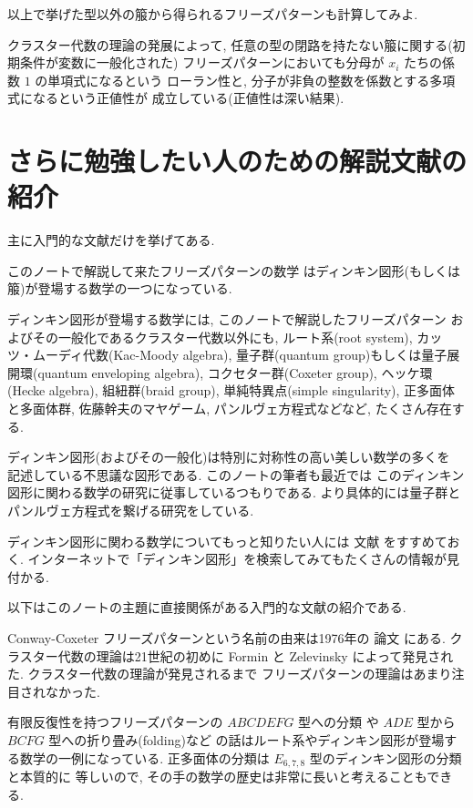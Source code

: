 \documentclass[12pt,twoside,dvipdfm]{jarticle}
\theoremstyle{definition} %
\theoremstyle{definition} %
\theoremstyle{definition} %
\numberwithin{theorem}{section}
\numberwithin{equation}{section}
\numberwithin{figure}{section}
\numberwithin{table}{section}
\begin{document}
以上で挙げた型以外の箙から得られるフリーズパターンも計算してみよ.

クラスター代数の理論の発展によって, 
任意の型の閉路を持たない箙に関する(初期条件が変数に一般化された)
フリーズパターンにおいても分母が $x_i$ たちの係数 $1$ の単項式になるという
ローラン性と, 分子が非負の整数を係数とする多項式になるという正値性が
成立している(正値性は深い結果).


\section{さらに勉強したい人のための解説文献の紹介}

主に入門的な文献だけを挙げてある.

このノートで解説して来たフリーズパターンの数学
はディンキン図形(もしくは箙)が登場する数学の一つになっている.

ディンキン図形が登場する数学には, 
このノートで解説したフリーズパターン
およびその一般化であるクラスター代数以外にも, 
ルート系(root system), カッツ・ムーディ代数(Kac-Moody algebra),
量子群(quantum group)もしくは量子展開環(quantum enveloping algebra),
コクセター群(Coxeter group), ヘッケ環(Hecke algebra), 
組紐群(braid group), 単純特異点(simple singularity), 
正多面体と多面体群, 佐藤幹夫のマヤゲーム, 
パンルヴェ方程式などなど, たくさん存在する.

ディンキン図形(およびその一般化)は特別に対称性の高い美しい数学の多くを
記述している不思議な図形である.
このノートの筆者も最近では
このディンキン図形に関わる数学の研究に従事しているつもりである.
より具体的には量子群とパンルヴェ方程式を繋げる研究をしている.

ディンキン図形に関わる数学についてもっと知りたい人には
文献 \cite{SuTano23} をすすめておく.
インターネットで「ディンキン図形」を検索してみてもたくさんの情報が見付かる.

以下はこのノートの主題に直接関係がある入門的な文献の紹介である.

Conway-Coxeter フリーズパターンという名前の由来は1976年の
論文 \cite{Conway-Coxeter} にある.
クラスター代数の理論は21世紀の初めに
Formin と Zelevinsky によって発見された.
クラスター代数の理論が発見されるまで
フリーズパターンの理論はあまり注目されなかった.

有限反復性を持つフリーズパターンの $ABCDEFG$ 型への分類
や $ADE$ 型から $BCFG$ 型への折り畳み(folding)など
の話はルート系やディンキン図形が登場する数学の一例になっている.
正多面体の分類は $E_{6,7,8}$ 型のディンキン図形の分類と本質的に
等しいので, その手の数学の歴史は非常に長いと考えることもできる.
\end{document}
